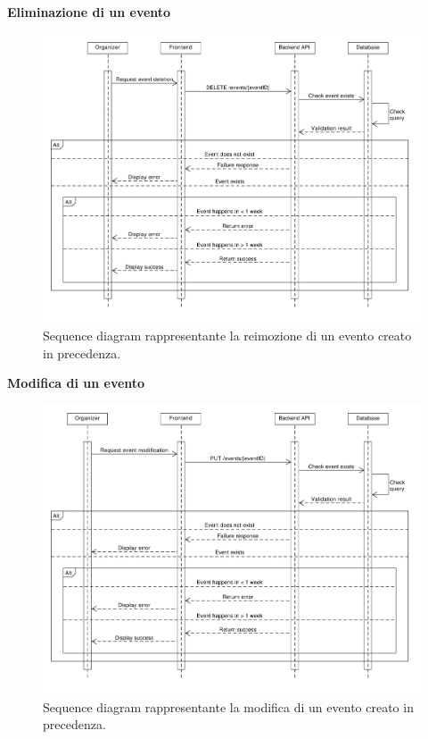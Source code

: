 \documentclass[9pt]{extarticle}
\begin{document}
\newpage
\textbf{Eliminazione di un evento}
\begin{figure}[!htb]
	\centering
	\includegraphics[width=\linewidth]{./images/SequenceDiagramEventDeletion.pdf}
	\caption{Sequence diagram rappresentante la reimozione di un evento creato in precedenza.}
	\label{fig:SeqDiagEventDeletion}
\end{figure}

\newpage
\textbf{Modifica di un evento}
\begin{figure}[!htb]
	\centering
	\includegraphics[width=\linewidth]{./images/SequenceDiagramEventModification.pdf}
	\caption{Sequence diagram rappresentante la modifica di un evento creato in precedenza.}
	\label{fig:SeqDiagEventModification}
\end{figure}
\end{document}
